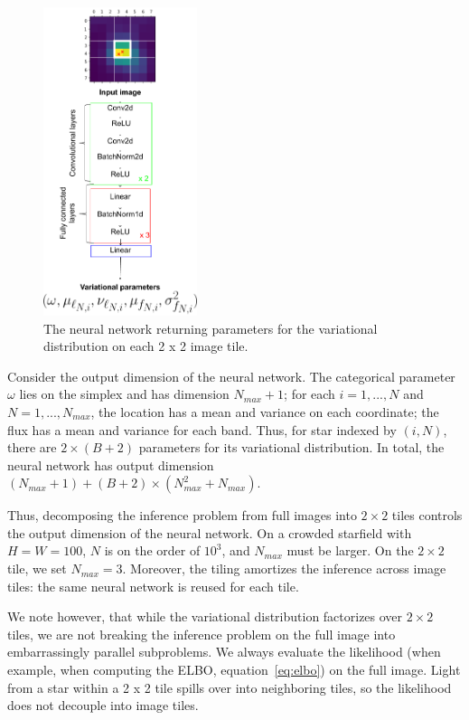 \begin{figure}[h]
    \centering
    \includegraphics[width=0.4\textwidth]{figures/starnet_archetecture2.png}
    \vspace{-0.5cm}
    \caption{The neural network returning parameters for the variational distribution on each 2 x 2 image tile.}
    \label{fig:starnet_arch}
\end{figure}

Consider the output dimension of the neural network. The categorical parameter $\omega$ lies on the 
simplex and has dimension $N_{max} + 1$; for each $i = 1, ..., N$ and $N = 1, ..., N_{max}$, the location has a mean and variance on each coordinate; the flux has a mean and variance for each band. Thus, for star indexed by $(i, N)$, 
there are $2 \times (B + 2)$ parameters for its variational distribution. In total, the neural network has output dimension $(N_{max} + 1) + (B + 2) \times (N_{max}^2 + N_{max})$. 

Thus, decomposing the inference problem from full images into $2 \times 2$ tiles controls the output dimension of the neural network. 
On a crowded starfield with $H = W = 100$, $N$ is on the order of $10^3$, 
and $N_{max}$ must be larger. 
On the $2\times 2$ tile, we set $N_{max} = 3$. 
Moreover, the tiling amortizes the inference across image tiles: the same neural network is reused for each tile. 

We note however, that while the variational distribution factorizes over $2 \times 2$ tiles, we are not breaking the inference problem on the full image into embarrassingly parallel subproblems. We always evaluate the likelihood (when example, when computing the ELBO, equation~\eqref{eq:elbo}) on the full image. 
Light from a star within a 2 x 2 tile spills over into neighboring tiles, so the likelihood does not decouple into image tiles. 
